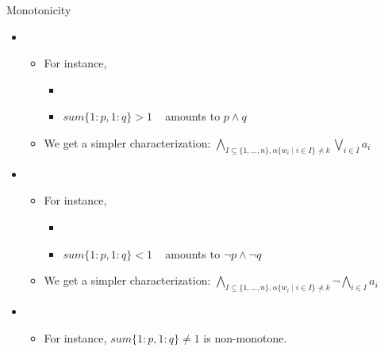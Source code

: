 \begin{frame}{Monotonicity}
  \smallskip
  \begin{itemize}
  \item {} \
    \begin{itemize}
    \item For instance,
      \begin{itemize}
      \item {}
      \item $\mathit{sum}\{1:p,1:q\}>1$ \ \onslide<2-> amounts to $p\wedge q$\onslide<1->
      \end{itemize}
    \item We get a simpler characterization:
      \(
      \bigwedge_{I \subseteq \{1,\dots,n\}, \alpha \{ w_i \mid i \in I \} \not \prec k}
      \bigvee_{i \in \overline{I}} a_i
      \)
    \end{itemize}
    \smallskip
  \item {} \
    \begin{itemize}
    \item For instance,
      \begin{itemize}
      \item {}
      \item $\mathit{sum}\{1:p,1:q\}<1$ \ \onslide<2-> amounts to $\neg p\wedge\neg q$\onslide<1->
      \end{itemize}
    \item  We get a simpler characterization:
      \(
      \bigwedge_{I \subseteq \{1,\dots,n\}, \alpha \{ w_i \mid i \in I \} \not \prec k}
      \neg\bigwedge_{i \in I} a_i
      \)
    \end{itemize}
    \smallskip
  \item {} \
    \begin{itemize}
    \item For instance, $\mathit{sum}\{1:p,1:q\}\neq 1$
      is non-monotone.
    \end{itemize}
  \end{itemize}
\end{frame}
%
